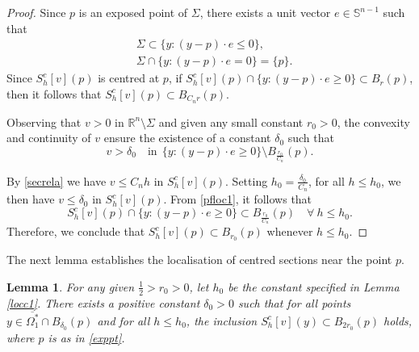 \documentclass[11pt]{amsart}
\theoremstyle{plain}
\newtheorem{lemma}{Lemma}[section]
\newcommand{\0}{\textbf{0}}
\numberwithin{equation}{section}
\numberwithin{equation}{section}
\numberwithin{figure}{section}
\begin{document}
\begin{proof}
Since \( p \) is an exposed point of \( \Sigma \), there exists a unit vector $e\in\mathbb{S}^{n-1}$ such that 
	\begin{align*} 
		& \Sigma \subset \{ y : (y - p) \cdot e \leq 0 \}, \\
		& \Sigma \cap \{ y : (y - p) \cdot e = 0 \} = \{ p \}.
	\end{align*} 
Since $S^c_h[v](p)$ is centred at $p$, if $S^c_h[v](p) \cap \{ y : (y - p) \cdot e \geq 0 \} \subset B_r(p) $, then it follows that $S^c_h[v](p) \subset B_{C_n r}(p)$.

Observing that \( v > 0 \) in \( \mathbb{R}^n \setminus \Sigma \) and given any small constant \( r_0>0 \), the convexity and continuity of \( v \) ensure the existence of a constant \( \delta_0 \) such that
\begin{equation}\label{pfloc1}
v > \delta_0 \quad \text{in} \ \ \{ y : (y - p) \cdot e \geq 0 \} \setminus B_{\frac{r_0}{C_n}}(p).
\end{equation}

By \eqref{secrela} we have $v \leq C_n h$ in $S^c_h[v](p)$. Setting \( h_0 = \frac{\delta_0}{C_n} \), for all \( h \leq h_0 \), we then have \( v \leq \delta_0 \) in \( S^c_h[v](p) \). From \eqref{pfloc1}, it follows that
\[ S^c_h[v](p) \cap \{ y : (y - p) \cdot e \geq 0 \} \subset B_{\frac{r_0}{C_n}}(p) \quad \forall\ h \leq h_0. \]
Therefore, we conclude that \( S^c_h[v](p) \subset B_{r_0}(p) \) whenever \( h \leq h_0 \).
\end{proof}


The next lemma establishes the localisation of centred sections near the point $p$. 

\begin{lemma}\label{locc2}
For any given \( \frac{1}{2} > r_0 > 0 \), let \( h_0 \) be the constant specified in Lemma \ref{locc1}. There exists a positive constant \( \delta_0 > 0 \) such that for all points \( y \in \overline{\Omega_1^*} \cap B_{\delta_0}(p) \) and for all \( h \leq h_0 \), the inclusion \( S_h^c[v](y) \subset B_{2r_0}(p) \) holds,  where $p$ is as in \eqref{exppt}. 
\end{lemma}
\end{document}
